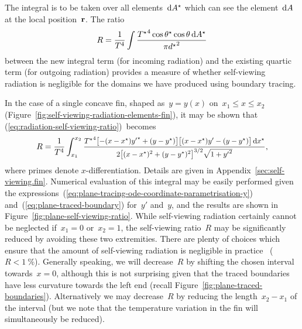The integral is to be taken over all elements~$\mathop{}\!\mathrm{d} A^\star$
which can see the element~$\mathop{}\!\mathrm{d} A$ at the local position~$\boldsymbol{\mathbf{r}}$.
The ratio
\begin{equation}
  \savecontent{
    R =
      \frac{1}{T^4}
      \int
        \frac{
          {T^\star}^4 \cos\theta^\star \cos\theta \td A^\star
        }{
          \pi {d^\star}^2
        }
  }{eq:radiation-self-viewing-ratio}
\end{equation}
between the new integral term (for incoming radiation)
and the existing quartic term (for outgoing radiation)
provides a measure of whether self-viewing radiation is negligible
for the domains we have produced using boundary tracing.

\begin{figure}
\end{figure}

In the case of a single concave fin,
shaped as~$y = y (x)$ on~$x_1 \le x \le x_2$
(Figure~\ref{fig:self-viewing-radiation-elements-fin}),
it may be shown that (\ref{eq:radiation-self-viewing-ratio})~becomes
\begin{equation}
  \savecontent{
    R =
      \frac{1}{T^4}
      \int_{x_1}^{x_2}
        \smallerfrac{
          {T^\star}^4
          \squarebr[\big]{-(x - x^\star) {y'}^\star + (y - y^\star)}
          \squarebr[\big]{(x - x^\star) y' - (y - y^\star)}
          \td x^\star
        }{
          2
          \squarebr[\big]{(x - x^\star)^2 + (y - y^\star)^2}^{3/2}
          \sqrt{1 + {y'}^2}
        }
  }{eq:plane-self-viewing-ratio},
\end{equation}
where primes denote $x$-differentiation.
Details are given in Appendix~\ref{sec:self-viewing.fin}.
Numerical evaluation of this integral may be easily performed
given the expressions~(\ref{eq:plane-tracing-ode-coordinate-parametrisation-y})
and~(\ref{eq:plane-traced-boundary}) for~$y'$ and~$y$,
and the results are shown in Figure~\ref{fig:plane-self-viewing-ratio}.
While self-viewing radiation certainly cannot be neglected
if~$x_1 = 0$ or~$x_2 = 1$,
the self-viewing ratio~$R$ may be significantly reduced
by avoiding these two extremities.
There are plenty of choices which ensure that
the amount of self-viewing radiation is negligible in practice~%
($R < \SI{1}{\percent}$).
Generally speaking,
we will decrease~$R$ by shifting the chosen interval towards~$x = 0$,
although this is not surprising
given that the traced boundaries have less curvature
towards the left end (recall Figure~\ref{fig:plane-traced-boundaries}).
Alternatively we may decrease~$R$
by reducing the length~$x_2 - x_1$ of the interval
(but we note that
the temperature variation in the fin will simultaneously be reduced).


